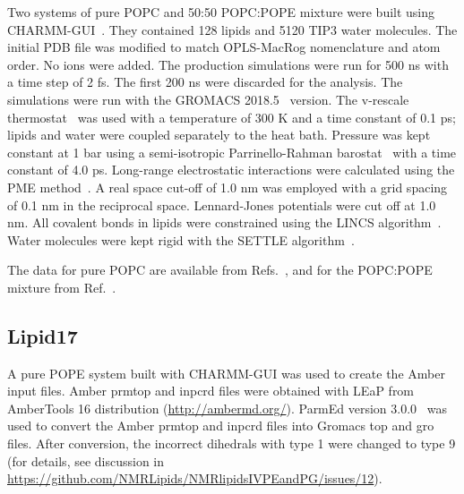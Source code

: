 \documentclass[journal=jpcbfk]{achemso}
\begin{document}
Two systems of pure POPC and 50:50 POPC:POPE mixture were built using CHARMM-GUI~\cite{lee16}. They contained 128 lipids and 5120 TIP3 water molecules. The initial PDB file was modified to match OPLS-MacRog nomenclature and atom order. No ions were added. The production simulations were run for 500 ns with a time step of 2 fs. The first 200 ns were discarded for the analysis. The simulations were run with the GROMACS 2018.5~\cite{abraham2015gromacs} version. The v-rescale thermostat~\cite{bussi07} was used with a temperature of 300 K and a time constant of 0.1 ps; lipids and water were coupled separately to the heat bath. Pressure was kept constant at 1 bar using a semi-isotropic Parrinello-Rahman barostat~\cite{parrinello81} with a time constant of 4.0 ps. Long-range electrostatic interactions were calculated using the PME method~\cite{darden93,essman95}. A real space cut-off of 1.0 nm was employed with a grid spacing of 0.1 nm in the reciprocal space. Lennard-Jones potentials were cut off at 1.0 nm. All covalent bonds in lipids were constrained using the LINCS algorithm~\cite{hess07,hess97}. Water molecules were kept rigid with the SETTLE algorithm~\cite{miyamoto92}.

The data for pure POPC are available from Refs.~, and for the POPC:POPE mixture from Ref.~.



\subsection{Lipid17}

A pure POPE system built with CHARMM-GUI was used to create the Amber input files.
Amber prmtop and inpcrd files were obtained with LEaP from AmberTools 16 distribution (\url{http://ambermd.org/}).
ParmEd version 3.0.0~\cite{shirts17} was used to convert the Amber prmtop and inpcrd files into Gromacs top and gro files. 
After conversion, the incorrect dihedrals with type 1 were changed to type 9
(for details, see discussion in \url{https://github.com/NMRLipids/NMRlipidsIVPEandPG/issues/12}).
\end{document}
